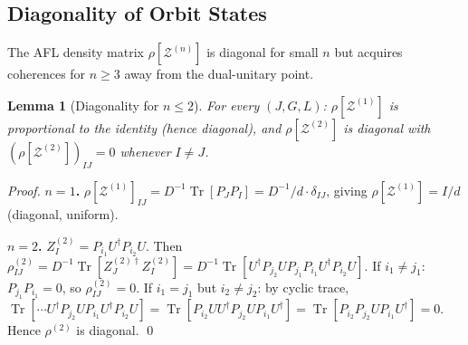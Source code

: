 \documentclass[12pt,a4paper]{article}
\newtheorem{lemma}[theorem]{Lemma}
\begin{document}
\subsection{Diagonality of Orbit States}
\label{sec:diag_orbit}

The AFL density matrix $\rho[\mathcal{Z}^{(n)}]$ is diagonal for small $n$
but acquires coherences for $n\geq 3$ away from the dual-unitary point.

\begin{lemma}[Diagonality for $n\leq 2$]
\label{lem:diag_n2}
For every $(J,G,L)$: $\rho[\mathcal{Z}^{(1)}]$ is proportional to the identity
(hence diagonal), and $\rho[\mathcal{Z}^{(2)}]$ is diagonal with
$(\rho[\mathcal{Z}^{(2)}])_{IJ}=0$ whenever $I\neq J$.
\end{lemma}

\begin{proof}
\textbf{$n=1$.} $\rho[\mathcal{Z}^{(1)}]_{IJ}=D^{-1}\operatorname{Tr}[P_J P_I]=D^{-1}/d\cdot\delta_{IJ}$,
giving $\rho[\mathcal{Z}^{(1)}]=I/d$ (diagonal, uniform).

\textbf{$n=2$.}
$Z_I^{(2)}=P_{i_1}U^\dagger P_{i_2}U$.  Then
$\rho_{IJ}^{(2)}=D^{-1}\operatorname{Tr}[Z_J^{(2)\dagger}Z_I^{(2)}]
=D^{-1}\operatorname{Tr}[U^\dagger P_{j_2}UP_{j_1}P_{i_1}U^\dagger P_{i_2}U]$.
If $i_1\neq j_1$: $P_{j_1}P_{i_1}=0$, so $\rho_{IJ}^{(2)}=0$.
If $i_1=j_1$ but $i_2\neq j_2$: by cyclic trace,
$\operatorname{Tr}[\cdots U^\dagger P_{j_2}UP_{i_1}U^\dagger P_{i_2}U]
=\operatorname{Tr}[P_{i_2}UU^\dagger P_{j_2}UP_{i_1}U^\dagger]
=\operatorname{Tr}[P_{i_2}P_{j_2}UP_{i_1}U^\dagger]=0$.
Hence $\rho^{(2)}$ is diagonal. \qed
\end{proof}
\end{document}
